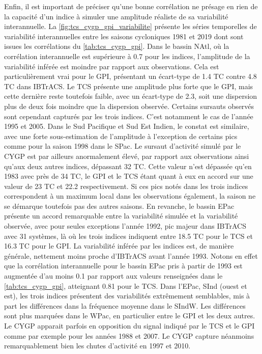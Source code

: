 \documentclass[../main.tex]{subfiles}
\begin{document}
Enfin, il est important de préciser qu'une bonne corrélation ne présage en rien de la capacité d'un indice à simuler une amplitude réaliste de sa variabilité
interannuelle. La \cref{fig:tcs_cygp_gpi_variabilite} présente les séries temporelles de variabilité interannuelles entre les saisons cycloniques \num{1981} et
\num{2019} dont sont issues les corrélations du \cref{tab:tcs_cygp_gpi}. Dans le bassin NAtl, où la corrélation interannuelle est supérieure à \num{0.7} pour
les indices, l'amplitude de la variabilité inférée est moindre par rapport aux observations. Cela est particulièrement vrai pour le GPI, présentant un
écart-type de \num{1.4} TC contre \num{4.8} TC dans IBTrACS. Le TCS présente une amplitude plus forte que le GPI, mais cette dernière reste toutefois faible,
avec un écart-type de \num{2.3}, soit une dispersion plus de deux fois moindre que la dispersion observée. Certains sursauts observés sont cependant capturés
par les trois indices. C'est notamment le cas de l'année \num{1995} et \num{2005}. Dans le Sud Pacifique et Sud Est Indien, le constat est similaire, avec une
forte sous-estimation de l'amplitude à l'exception de certains pics comme pour la saison \num{1998} dans le SPac. Le sursaut d'activité simulé par le CYGP est
par ailleurs anormalement élevé, par rapport aux observations ainsi qu'aux deux autres indices, dépassant \num{32} TC. Cette valeur n'est dépassée qu'en
\num{1983} avec près de \num{34} TC, le GPI et le TCS étant quant à eux en accord sur une valeur de \num{23} TC et \num{22.2} respectivement. Si ces pics notés
dans les trois indices correspondent à un maximum local dans les observations également, la saison ne se démarque toutefois pas des autres saisons. En revanche,
le bassin EPac présente un accord remarquable entre la variabilité simulée et la variabilité observée, avec pour seules exceptions l'année \num{1992}, pic
majeur dans IBTrACS avec \num{31} systèmes, là où les trois indices indiquent entre \num{18.5} TC pour le TCS et \num{16.3} TC pour le GPI. La variabilité
inférée par les indices est, de manière générale, nettement moins proche d'IBTrACS avant l'année \num{1993}. Notons en effet que la corrélation interannuelle
pour le bassin EPac pris à partir de \num{1993} est augmentée d'au moins \num{0.1} par rapport aux valeurs renseignées dans le \cref{tab:tcs_cygp_gpi},
atteignant \num{0.81} pour le TCS. Dans l'EPac, SInd (ouest et est), les trois indices présentent des variabilités extrêmement semblables, mis à part les
différences dans la fréquence moyenne dans le SIndW. Les différences sont plus marquées dans le WPac, en particulier entre le GPI et les deux autres. Le CYGP
apparait parfois en opposition du signal indiqué par le TCS et le GPI comme par exemple pour les années \num{1988} et \num{2007}. Le CYGP capture néanmoins
remarquablement bien les chutes d'activité en \num{1997} et \num{2010}.
\end{document}
